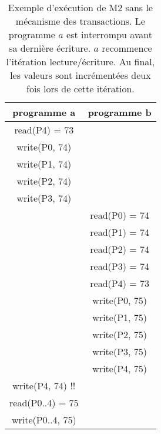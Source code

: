 \documentclass[a4paper,11pt]{article}
\begin{document}
\appendix

\begin{table}
\label{M2}
\caption{Exemple d'exécution de  M2  sans le mécanisme des transactions.
Le programme $a$ est interrompu avant sa dernière écriture. 
$a$ recommence l'itération lecture/écriture.
Au final, les valeurs sont incrémentées deux fois lors de cette itération.
}

\begin{center}
\begin{tabular}{|c|c|}
\hline 
programme a & programme b\tabularnewline
\hline 
\hline 
read(P4) = 73 & \tabularnewline
\hline 
write(P0, 74) & \tabularnewline
\hline 
write(P1, 74) & \tabularnewline
\hline 
write(P2, 74) & \tabularnewline
\hline 
write(P3, 74) & \tabularnewline
\hline 
 & read(P0) = 74\tabularnewline
\hline 
 & read(P1) = 74\tabularnewline
\hline 
 & read(P2) = 74\tabularnewline
\hline 
 & read(P3) = 74\tabularnewline
\hline 
 & read(P4) = 73\tabularnewline
\hline 
 & write(P0, 75)\tabularnewline
\hline 
 & write(P1, 75)\tabularnewline
\hline 
 & write(P2, 75)\tabularnewline
\hline 
 & write(P3, 75)\tabularnewline
\hline 
 & write(P4, 75)\tabularnewline
\hline 
write(P4, 74) !! & \tabularnewline
\hline 
read(P0..4) = 75 & \tabularnewline
\hline 
write(P0..4, 75) & \tabularnewline
\hline 
\end{tabular}
\end{center}
\end{table}
\end{document}
